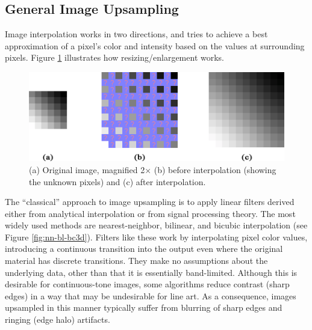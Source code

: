 \documentclass[]{usiinfbachelorproject}
\begin{document}

\subsection{General Image Upsampling} \label{sec:imageup}

Image interpolation works in two directions, and tries to achieve a best approximation of a pixel's color and intensity based on the values at surrounding pixels. Figure \ref{fig:interpol} illustrates how resizing/enlargement works.

\begin{figure} [ht]
	\centering
	\includegraphics[scale=0.6]{img/interpolation.png}
	\caption{(a) Original image, magnified 2$\times$ (b) before interpolation (showing the unknown pixels) and (c) after interpolation.}
	\label{fig:interpol}
\end{figure}

\noindent The ``classical'' approach to image upsampling is to apply linear filters derived either from analytical interpolation or from signal processing theory. The most widely used methods are nearest-neighbor, bilinear, and bicubic interpolation (see Figure \ref{fig:nn-bl-bc3d}). Filters like these work by interpolating pixel color values, introducing a continuous transition into the output even where the original material has discrete transitions. They make no assumptions about the underlying data, other than that it is essentially band-limited. Although this is desirable for continuous-tone images, some algorithms reduce contrast (sharp edges) in a way that may be undesirable for line art. As a consequence, images upsampled in this manner typically suffer from blurring of sharp edges and ringing (edge halo) artifacts.
\end{document}
